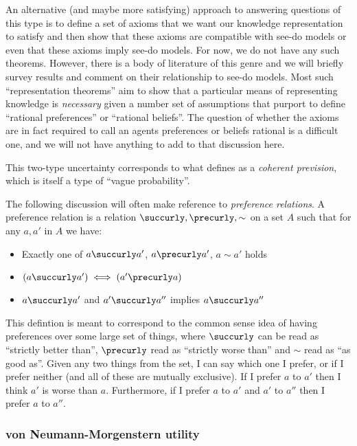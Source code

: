 An alternative (and maybe more satisfying) approach to answering questions of this type is to define a set of axioms that we want our knowledge representation to satisfy and then show that these axioms are compatible with see-do models or even that these axioms imply see-do models. For now, we do not have any such theorems. However, there is a body of literature of this genre and we will briefly survey results and comment on their relationship to see-do models. Most such ``representation theorems'' aim to show that a particular means of representing knowledge is \emph{necessary} given a number set of assumptions that purport to define ``rational preferences'' or ``rational beliefs''. The question of whether the axioms are in fact required to call an agents preferences or beliefs rational is a difficult one, and we will not have anything to add to that discussion here.

This two-type uncertainty corresponds to what \citet{walley_statistical_1991} defines as a \emph{coherent prevision}, which is itself a type of ``vague probability''.

The following discussion will often make reference to \emph{preference relations}. A preference relation is a relation $\succurly,\precurly,\sim$ on a set $A$ such that for any $a,a'$ in $A$ we have:
\begin{itemize}
    \item Exactly one of $a\succurly a'$, $a\precurly a'$, $a\sim a'$ holds
    \item $(a\succurly a')\iff(a'\precurly a)$
    \item $a\succurly a'$ and $a'\succurly a''$ implies $a\succurly a''$
\end{itemize}

This defintion is meant to correspond to the common sense idea of having preferences over some large set of things, where $\succurly$ can be read as ``strictly better than'', $\precurly$ read as ``strictly worse than'' and $\sim$ read as ``as good as''. Given any two things from the set, I can say which one I prefer, or if I prefer neither (and all of these are mutually exclusive). If I prefer $a$ to $a'$ then I think $a'$ is worse than $a$. Furthermore, if I prefer $a$ to $a'$ and $a'$ to $a''$ then I prefer $a$ to $a''$.

\subsubsection{von Neumann-Morgenstern utility}


